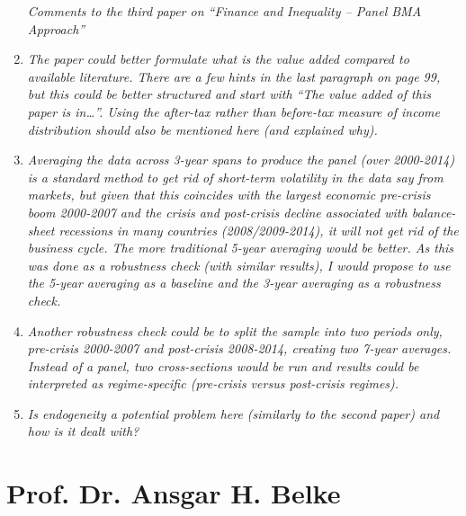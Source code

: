 \begin{enumerate}
    \textit{Comments to the third paper on ``Finance and Inequality – Panel BMA Approach''}

    \item \textit{The paper could better formulate what is the value added compared to available literature. There are a few hints in the last paragraph on page 99, but this could be better structured and start with ``The value added of this paper is in\dots''. Using the after-tax rather than before-tax measure of income distribution should also be mentioned here (and explained why).}
    
    \item \textit{Averaging the data across 3-year spans to produce the panel (over 2000-2014) is a standard method to get rid of short-term volatility in the data say from markets, but given that this coincides with the largest economic pre-crisis boom 2000-2007 and the crisis and post-crisis decline associated with balance-sheet recessions in many countries (2008/2009-2014), it will not get rid of the business cycle. The more traditional 5-year averaging would be better. As this was done as a robustness check (with similar results), I would propose to use the 5-year averaging as a baseline and the 3-year averaging as a robustness check.}
    
    \item \textit{Another robustness check could be to split the sample into two periods only, pre-crisis 2000-2007 and post-crisis 2008-2014, creating two 7-year averages. Instead of a panel, two cross-sections would be run and results could be interpreted as regime-specific (pre-crisis versus post-crisis regimes).}
    
    \item \textit{Is endogeneity a potential problem here (similarly to the second paper) and how is it dealt with?}
\end{enumerate}

\section{Prof. Dr. Ansgar H. Belke}



